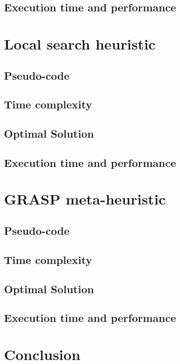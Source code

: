 \documentclass[a4paper, 12pt]{report}
\begin{document}
		\section{Execution time and performance}
	
	\chapter{Local search heuristic}
		\section{Pseudo-code}
			\begin{algorithm}
				
			\end{algorithm}
		
		\section{Time complexity}
		\section{Optimal Solution}
		\section{Execution time and performance}
	
	\chapter{GRASP meta-heuristic}
		\section{Pseudo-code}
			\begin{algorithm}
				
			\end{algorithm}
		\section{Time complexity}
		\section{Optimal Solution}
		\section{Execution time and performance}
	
	\chapter{Conclusion}
	
	
\end{document}

